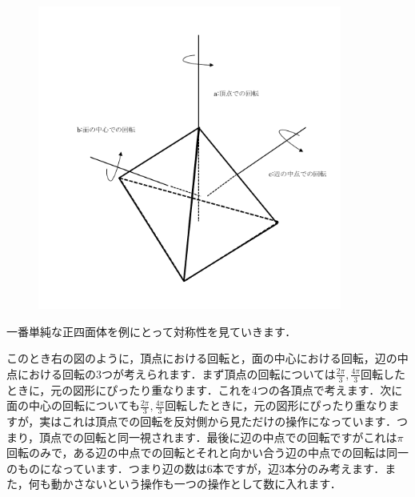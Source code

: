\documentclass{jreport}
\theoremstyle{definition} %
\begin{document}
\begin{figure}
  \vspace{-4\baselineskip}
  \begin{center}
    \includegraphics[width=10cm]{Inoue_image/i1.pdf}
  \end{center}
  \vspace{-3\baselineskip}
\end{figure}

一番単純な正四面体を例にとって対称性を見ていきます．

このとき右の図のように，頂点における回転と，面の中心における回転，辺の中点における回転の$3$つが考えられます．まず頂点の回転については$\frac{2\pi}{3},\frac{4\pi}{3}$回転したときに，元の図形にぴったり重なります．これを4つの各頂点で考えます．次に面の中心の回転についても$\frac{2\pi}{3},\frac{4\pi}{3}$回転したときに，元の図形にぴったり重なりますが，実はこれは頂点での回転を反対側から見ただけの操作になっています．つまり，頂点での回転と同一視されます．最後に辺の中点での回転ですがこれは$\pi$回転のみで，ある辺の中点での回転とそれと向かい合う辺の中点での回転は同一のものになっています．つまり辺の数は6本ですが，辺3本分のみ考えます．また，何も動かさないという操作も一つの操作として数に入れます．
\end{document}
